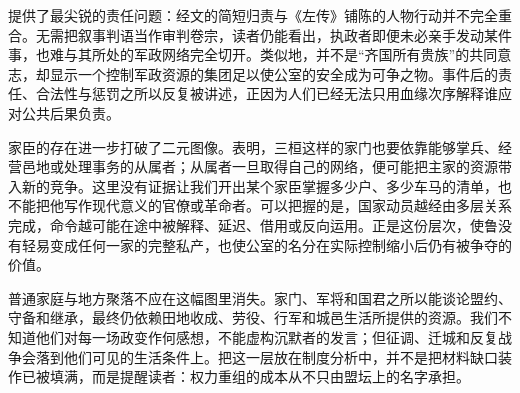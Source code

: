 提供了最尖锐的责任问题：经文的简短归责与《左传》铺陈的人物行动并不完全重合。无需把叙事判语当作审判卷宗，读者仍能看出，执政者即便未必亲手发动某件事，也难与其所处的军政网络完全切开。类似地，并不是“齐国所有贵族”的共同意志，却显示一个控制军政资源的集团足以使公室的安全成为可争之物。事件后的责任、合法性与惩罚之所以反复被讲述，正因为人们已经无法只用血缘次序解释谁应对公共后果负责。

家臣的存在进一步打破了二元图像。表明，三桓这样的家门也要依靠能够掌兵、经营邑地或处理事务的从属者；从属者一旦取得自己的网络，便可能把主家的资源带入新的竞争。这里没有证据让我们开出某个家臣掌握多少户、多少车马的清单，也不能把他写作现代意义的官僚或革命者。可以把握的是，国家动员越经由多层关系完成，命令越可能在途中被解释、延迟、借用或反向运用。正是这份层次，使鲁没有轻易变成任何一家的完整私产，也使公室的名分在实际控制缩小后仍有被争夺的价值。

普通家庭与地方聚落不应在这幅图里消失。家门、军将和国君之所以能谈论盟约、守备和继承，最终仍依赖田地收成、劳役、行军和城邑生活所提供的资源。我们不知道他们对每一场政变作何感想，不能虚构沉默者的发言；但征调、迁城和反复战争会落到他们可见的生活条件上。把这一层放在制度分析中，并不是把材料缺口装作已被填满，而是提醒读者：权力重组的成本从不只由盟坛上的名字承担。
